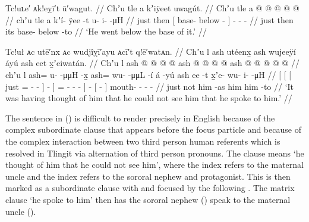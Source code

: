 \ex\label{ex:91-56-went-to-base}%
%
\begingl
	\glpreamble	Tc!uʟe′ ᴀk!eỵī′t ū′wagut. //
	\glpreamble	Chʼu tle a kʼiÿeet uwagút. //
	\gla	Chʼu tle {} a  @ {} @ {} {}
		 @ {} @ {} @ {} //
	\glb	chʼu tle {} a kʼí- ÿee -t {}
		u- i-  -μH //
	\glc	just then {}[  base- below - {}]
		- -  - //
	\gld	just then {} its base- below -to {}
		 {} {} {} //
	\glft	‘He went below the base of it.’
		//
\endgl
\xe

\ex\label{ex:91-57-thinking-not-seen-spoke}%
%
\begingl
	\glpreamble	Tc!uł ᴀc utē′nx ᴀc wudjîỵī′ayu ᴀcī′t q!ē′watᴀn. //
	\glpreamble	Chʼu l ash utéenx̱ ash wujeeÿí áyú ash eet x̱ʼeiwatán. //
	\gla	{} {} {} Chʼu l ash @  @ {} @ {} @ {} {} {} {}
			ash  @ {} @ {} @ {} {}  @ {}
		{} ash  @ {} {}
		 @ {} @ {} @ {} @ {} //
	\glb	{} {} {} chʼu l ash= u-  -μμH {} {} -x̱ {}
			ash= wu-  -μμL -í {} á -yú
		{} ash ee -t {}
		x̱ʼe- wu- i-  -μH //
	\glc	{}[ {}[ {}[ just 
			= -  - \· {}] - {}]
			= -  - - {}]  -
		{}[   - {}]
		mouth- - -  - //
	\gld	{} {} {} just not him  {} {} {} {} -as {}
		him  {} {} {} {}  {}
		{} him {} -to {}
		 {} {} {} {} //
	\glft	‘It was having thought of him that he could not see him that he spoke to him.’
		//
\endgl
\xe

The sentence in (\lastx) is difficult to render precisely in English because of the complex subordinate clause that appears before the focus particle  and because of the complex interaction between two third person human referents which is resolved in Tlingit via alternation of third person  pronouns.
The clause  means ‘he thought of him that he could not see him’, where the index  refers to the maternal uncle and the index  refers to the sororal nephew and protagonist.
This is then marked as a subordinate clause with  and focused by the following .
The matrix clause  ‘he spoke to him’ then 
has the sororal nephew () speak to the maternal uncle (\!\!). 

